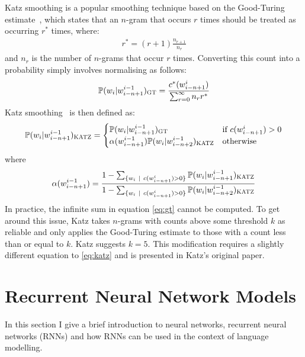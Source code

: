 \documentclass[a4paper, 12pt]{report}
\begin{document}
Katz smoothing is a popular smoothing technique based on the Good-Turing estimate~\cite{good_turing:good1953}, which states that an $n$-gram that occurs $r$ times should be treated as occurring $r^*$ times, where:
\begin{gather}
	r^* = (r + 1)\frac{n_{r + 1}}{n_r}
\end{gather}
and $n_r$ is the number of $n$-grams that occur $r$ times. Converting this count into a probability simply involves normalising as follows:
\begin{gather} \label{eq:gt}
	\mathbb{P}(w_i | w_{i - n + 1}^{i - 1})_{\text{\scshape GT}} = \frac{c^*(w_{i - n + 1}^{i})}{\sum_{r = 0}^\infty n_r r^*}
\end{gather}
Katz smoothing~\cite{katz_smoothing:katz1987} is then defined as:
\begin{gather} \label{eq:katz}
	\mathbb{P}(w_i | w_{i - n + 1}^{i - 1})_{\text{\scshape KATZ}} = \begin{cases}
		\mathbb{P}(w_i | w_{i - n + 1}^{i - 1})_{\text{\scshape GT}} &\text{if }c(w_{i - n + 1}^i) > 0 \\
		\alpha(w_{i - n + 1}^{i - 1})\mathbb{P}(w_i | w_{i - n + 2}^{i - 1})_{\text{\scshape KATZ}} &\text{otherwise}
	\end{cases}
\end{gather}
where
\begin{gather}
	\alpha(w_{i - n + 1}^{i - 1}) = \frac{1 - \sum_{\{w_i\ |\ c(w_{i - n + 1}^i) > 0\}} \mathbb{P}(w_i | w_{i - n + 1}^{i - 1})_{\text{\scshape KATZ}}}{1 - \sum_{\{w_i\ |\ c(w_{i - n + 1}^i) > 0\}} \mathbb{P}(w_i | w_{i - n + 2}^{i - 1})_{\text{\scshape KATZ}}}
\end{gather}
In practice, the infinite sum in equation \ref{eq:gt} cannot be computed. To get around this issue, Katz takes $n$-grams with counts above some threshold $k$ as reliable and only applies the Good-Turing estimate to those with a count less than or equal to $k$. Katz suggests $k = 5$. This modification requires a slightly different equation to \ref{eq:katz} and is presented in Katz's original paper.

\section{Recurrent Neural Network Models}

In this section I give a brief introduction to neural networks, recurrent neural networks (RNNs) and how RNNs can be used in the context of language modelling.
\end{document}
